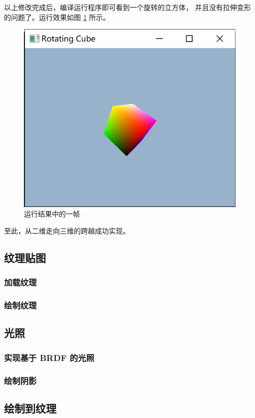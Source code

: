 \documentclass[fontset=windows]{ctexart}
\begin{document}
以上修改完成后，编译运行程序即可看到一个旋转的立方体，
并且没有拉伸变形的问题了。运行效果如图 \ref{fig-gl:rotating-cube} 所示。

\begin{figure}
\centering
\includegraphics[width=0.5\linewidth]{imgs/sec 4.7/rotating-cube.png}
\caption{运行结果中的一帧}
\label{fig-gl:rotating-cube}
\end{figure}

至此，从二维走向三维的跨越成功实现。


\subsection{纹理贴图}

\subsubsection{加载纹理}

\subsubsection{绘制纹理}

\subsection{光照}

\subsubsection{实现基于 BRDF 的光照}

\subsubsection{绘制阴影}

\subsection{绘制到纹理}
\end{document}
